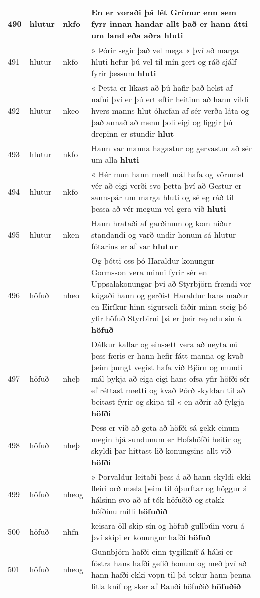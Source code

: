 \documentclass{article}
\begin{document}
\begin{longtable}{p{1cm}|p{1cm}|p{1cm}|p{13cm}}
\hline
490&hlutur&nkfo&En er voraði þá lét Grímur enn sem fyrr innan handar allt það er hann átti um land eða aðra \textbf{hluti} \\
\hline
491&hlutur&nkfo&» Þórir segir það vel mega « því að marga hluti hefur þú vel til mín gert og ráð sjálf fyrir þessum \textbf{hluti} \\
\hline
492&hlutur&nkeo&« Þetta er líkast að þú hafir það helst af nafni því er þú ert eftir heitinn að hann vildi hvers manns hlut óhæfan af sér verða láta og það annað að menn þoli eigi og liggir þú drepinn er stundir \textbf{hlut} \\
\hline
493&hlutur&nkfo&Hann var manna hagastur og gervastur að sér um alla \textbf{hluti} \\
\hline
494&hlutur&nkfo&« Hér mun hann mælt mál hafa og vörumst vér að eigi verði svo þetta því að Gestur er sannspár um marga hluti og sé eg ráð til þessa að vér megum vel gera við \textbf{hluti} \\
\hline
495&hlutur&nken&Hann hrataði af garðinum og kom niður standandi og varð undir honum sá hlutur fótarins er af var \textbf{hlutur} \\
\hline
496&höfuð&nheo&Og þótti oss þó Haraldur konungur Gormsson vera minni fyrir sér en Uppsalakonungar því að Styrbjörn frændi vor kúgaði hann og gerðist Haraldur hans maður en Eiríkur hinn sigursæli faðir minn steig þó yfir höfuð Styrbirni þá er þeir reyndu sín á \textbf{höfuð} \\
\hline
497&höfuð&nheþ&Dálkur kallar og einsætt vera að neyta nú þess færis er hann hefir fátt manna og kvað þeim þungt vegist hafa við Björn og mundi mál þykja að eiga eigi hans ofsa yfir höfði sér ef réttast mætti og kvað Þórð skyldan til að beitast fyrir og skipa til « en aðrir að fylgja \textbf{höfði} \\
\hline
498&höfuð&nheþ&Þess er við að geta að höfði sá gekk einum megin hjá sundunum er Hofshöfði heitir og skyldi þar hittast lið konungsins allt við \textbf{höfði} \\
\hline
499&höfuð&nheog&» Þorvaldur leitaði þess á að hann skyldi ekki fleiri orð mæla þeim til óþurftar og höggur á hálsinn svo að af tók höfuðið og stakk höfðinu milli \textbf{höfuðið} \\
\hline
500&höfuð&nhfn&keisara öll skip sín og höfuð gullbúin voru á því skipi er konungur hafði \textbf{höfuð} \\
\hline
501&höfuð&nheog&Gunnbjörn hafði einn tygilkníf á hálsi er fóstra hans hafði gefið honum og með því að hann hafði ekki vopn til þá tekur hann þenna litla kníf og sker af Rauði höfuðið \textbf{höfuðið} \\

\end{longtable}
\end{document}
